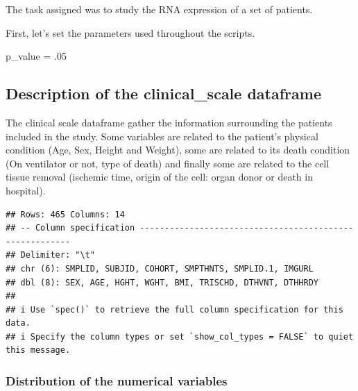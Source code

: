 \documentclass[
]{article}
\newenvironment{Shaded}{\begin{snugshade}}{\end{snugshade}}
\newcommand{\DecValTok}[1]{\textcolor[rgb]{0.00,0.00,0.81}{#1}}
\newcommand{\NormalTok}[1]{#1}
\newcommand{\OtherTok}[1]{\textcolor[rgb]{0.56,0.35,0.01}{#1}}
\begin{document}
The task assigned was to study the RNA expression of a set of patients.

First, let's set the parameters used throughout the scripts.

\begin{Shaded}
\begin{Highlighting}[]
\NormalTok{  p\_value }\OtherTok{=}\NormalTok{ .}\DecValTok{05}
\end{Highlighting}
\end{Shaded}

\hypertarget{description-of-the-clinical_scale-dataframe}{%
\subsection{Description of the clinical\_scale
dataframe}\label{description-of-the-clinical_scale-dataframe}}

The clinical scale dataframe gather the information surrounding the
patients included in the study. Some variables are related to the
patient's physical condition (Age, Sex, Height and Weight), some are
related to its death condition (On ventilator or not, type of death) and
finally some are related to the cell tissue removal (ischemic time,
origin of the cell: organ donor or death in hospital).

\begin{verbatim}
## Rows: 465 Columns: 14
## -- Column specification --------------------------------------------------------
## Delimiter: "\t"
## chr (6): SMPLID, SUBJID, COHORT, SMPTHNTS, SMPLID.1, IMGURL
## dbl (8): SEX, AGE, HGHT, WGHT, BMI, TRISCHD, DTHVNT, DTHHRDY
## 
## i Use `spec()` to retrieve the full column specification for this data.
## i Specify the column types or set `show_col_types = FALSE` to quiet this message.
\end{verbatim}

\hypertarget{distribution-of-the-numerical-variables}{%
\subsubsection{Distribution of the numerical
variables}\label{distribution-of-the-numerical-variables}}
\end{document}
